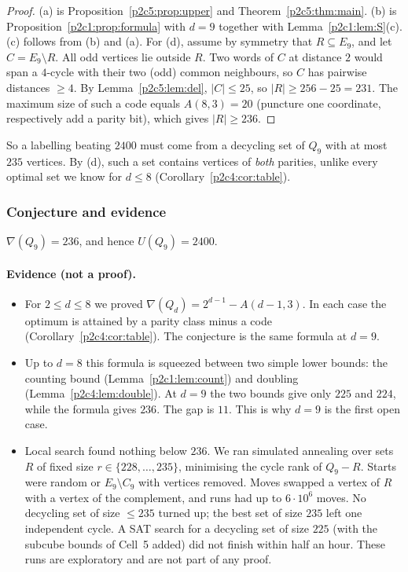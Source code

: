 \begin{proof}
(a) is Proposition~\ref{p2c5:prop:upper} and Theorem~\ref{p2c5:thm:main}. (b) is
Proposition~\ref{p2c1:prop:formula} with $d=9$ together with Lemma~\ref{p2c1:lem:S}(c).
(c) follows from (b) and (a). For (d), assume by symmetry that $R\subseteq E_9$, and let
$C=E_9\setminus R$. All odd vertices lie outside $R$. Two words of $C$ at distance $2$ would span a
$4$-cycle with their two (odd) common neighbours, so $C$ has pairwise distances $\ge4$. By
Lemma~\ref{p2c5:lem:del}, $|C|\le25$, so $|R|\ge256-25=231$. The maximum size of such a code equals
$A(8,3)=20$ (puncture one coordinate, respectively add a parity bit), which gives $|R|\ge236$.
\end{proof}

So a labelling beating $2400$ must come from a decycling set of $Q_9$ with at most $235$ vertices.
By (d), such a set contains vertices of \emph{both} parities, unlike every optimal set we know for
$d\le8$ (Corollary~\ref{p2c4:cor:table}).

\subsubsection{Conjecture and evidence}

\begin{conjecture}\label{p2c6:conj}
$\nabla(Q_9)=236$, and hence $U(Q_9)=2400$.
\end{conjecture}

\paragraph{Evidence (not a proof).}
\begin{itemize}
\item For $2\le d\le8$ we proved $\nabla(Q_d)=2^{d-1}-A(d-1,3)$. In each case the optimum is attained
  by a parity class minus a code (Corollary~\ref{p2c4:cor:table}). The conjecture is the same
  formula at $d=9$.
\item Up to $d=8$ this formula is squeezed between two simple lower bounds: the counting bound
  (Lemma~\ref{p2c1:lem:count}) and doubling (Lemma~\ref{p2c4:lem:double}). At $d=9$ the two bounds
  give only $225$ and $224$, while the formula gives $236$. The gap is $11$. This is why $d=9$ is the
  first open case.
\item Local search found nothing below $236$. We ran simulated annealing over sets $R$ of fixed
  size $r\in\{228,\dots,235\}$, minimising the cycle rank of $Q_9-R$. Starts were random or
  $E_9\setminus C_9$ with vertices removed. Moves swapped a vertex of $R$ with a vertex of the
  complement, and runs had up to $6\cdot10^6$ moves. No decycling set of size $\le235$ turned up; the
  best set of size $235$ left one independent cycle. A SAT search for a decycling set of size $225$
  (with the subcube bounds of Cell~5 added) did not finish within half an hour. These runs are
  exploratory and are not part of any proof.
\end{itemize}

